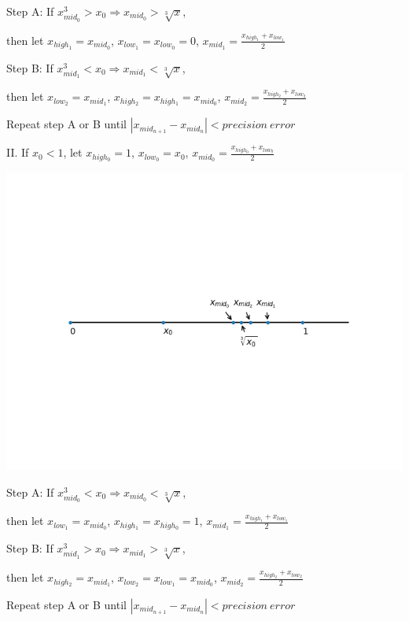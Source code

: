 \documentclass[a4paper]{scrartcl}
\begin{document}
Step A: If \(x^3_{mid_0} > x_0 \Rightarrow x_{mid_0} > \sqrt[3]{x}\),

then let \(x_{high_1} = x_{mid_0}\), \(x_{low_1} = x_{low_0} = 0\), \(x_{mid_1} = \frac{x_{high_1} + x_{low_1}}{2}\)

Step B: If \(x^3_{mid_1} < x_0 \Rightarrow x_{mid_1} < \sqrt[3]{x}\),

then let \(x_{low_2} = x_{mid_1}\), \(x_{high_2} = x_{high_1} = x_{mid_0}\), \(x_{mid_2} = \frac{x_{high_2} + x_{low_2}}{2}\)

Repeat step A or B until \(|x_{mid_{n+1}} - x_{mid_n}| < precision~error\)

II. If \(x_0 < 1\), let \(x_{high_0} = 1\), \(x_{low_0} = x_0\), \(x_{mid_0} = \frac{x_{high_0} + x_{low_0}}{2}\)
\begin{center}
\includegraphics[width=.9\linewidth]{numberAxis2.png}
\end{center}

Step A: If \(x^3_{mid_0} < x_0 \Rightarrow x_{mid_0} < \sqrt[3]{x}\),

then let \(x_{low_1} = x_{mid_0}\), \(x_{high_1} = x_{high_0} = 1\), \(x_{mid_1} = \frac{x_{high_1} + x_{low_1}}{2}\)

Step B: If \(x^3_{mid_1} > x_0 \Rightarrow x_{mid_1} > \sqrt[3]{x}\),

then let \(x_{high_2} = x_{mid_1}\), \(x_{low_2} = x_{low_1} = x_{mid_0}\), \(x_{mid_2} = \frac{x_{high_2} + x_{low_2}}{2}\)

Repeat step A or B until \(|x_{mid_{n+1}} - x_{mid_n}| < precision~error\)
\end{document}
